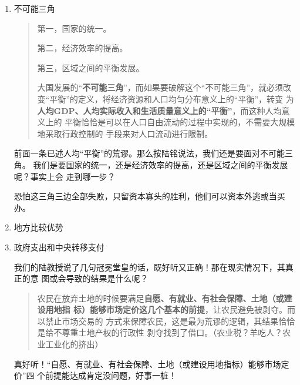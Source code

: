 \begin{enumerate}
\item 不可能三角

  \begin{quotation}

    第一，国家的统一。

    第二，经济效率的提高。

    第三，区域之间的平衡发展。

    大国发展的“\textbf{不可能三角}”，而如果要破解这个“不可能三角”，就必须改
    变“平衡”的定义，将经济资源和人口均匀分布意义上的“平衡”，转变
    为\textbf{人均GDP、人均实际收入和生活质量意义上的“平衡”}，而这种人均意义上的
    平衡恰恰是可以在人口自由流动的过程中实现的，不需要大规模地采取行政控制的
    手段来对人口流动进行限制。
  \end{quotation}

  前面一条已述人均“平衡”的荒谬。那么按陆铭说法，我们还是要面对不可能三角。
  我们是要国家的统一，还是经济效率的提高，还是区域之间的平衡发展呢？事实上会
  走到哪一步？

  恐怕这三角三边全部失败，只留资本寡头的胜利，他们可以资本外逃或当买办。

\item 地方比较优势

\item 政府支出和中央转移支付

  我们的陆教授说了几句冠冕堂皇的话，既好听又正确！那在现实情况下，其真正的意
  图或会导致的结果是什么呢？



  \begin{quotation}
    农民在放弃土地的时候要满足\textbf{自愿、有就业、有社会保障、土地（或建设用地指
      标）能够市场定价这几个基本的前提}，让农民避免被剥夺。而以禁止市场交易的
    方式来保障农民，这是最为荒谬的逻辑，其结果恰恰是给不尊重土地产权的行政性
    剥夺找到了借口。（农业税？羊吃人？农业工业化的挤出）
  \end{quotation}

  真好听！“自愿、有就业、有社会保障、土地（或建设用地指标）能够市场定价”四
  个前提能达成肯定没问题，好事一桩！


\end{enumerate}
